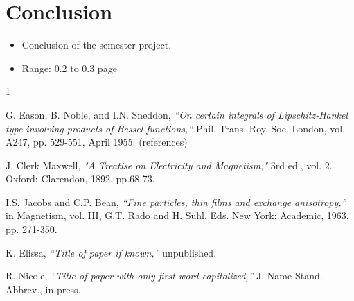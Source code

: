 \documentclass[onecolumn, conference]{IEEEtran}
\newcommand{\range}[2][0]{Range: #1 to #2 page}
\newcommand{\conciseItem}{\itemsep1pt \parskip0pt \parsep0pt}
\begin{document}
\section{Conclusion}
\begin{itemize}
	\conciseItem
	\item Conclusion of the semester project.
	\item \range[0.2]{0.3}
\end{itemize}




%
%
%
\begin{thebibliography}{1}

G. Eason, B. Noble, and I.N. Sneddon, \emph{“On certain integrals of Lipschitz-Hankel type involving products of Bessel functions,“} Phil. Trans. Roy. Soc. London, vol. A247, pp. 529-551, April 1955. (references)

J. Clerk Maxwell, \emph{"A Treatise on Electricity and Magnetism,"} 3rd ed., vol. 2. Oxford: Clarendon, 1892, pp.68-73.

I.S. Jacobs and C.P. Bean, \emph{“Fine particles, thin films and exchange anisotropy,”} in Magnetism, vol. III, G.T. Rado and H. Suhl, Eds. New York: Academic, 1963, pp. 271-350.

K. Elissa, \emph{“Title of paper if known,”} unpublished.

R. Nicole, \emph{“Title of paper with only first word capitalized,”} J. Name Stand. Abbrev., in press.

\end{thebibliography}
\end{document}
